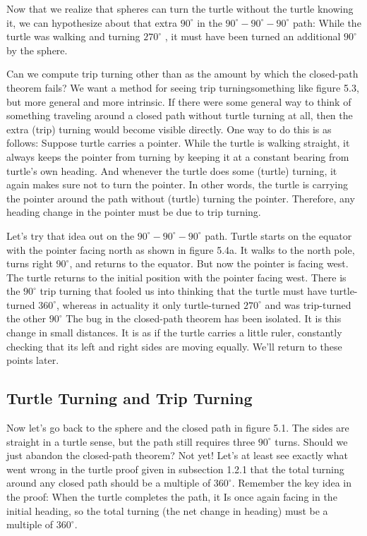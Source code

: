 \documentclass{book}
\begin{document}
Now that we realize that spheres can turn the turtle without the turtle
knowing it, we can hypothesize about that extra $90^{\circ}$ in the $90^{\circ}-90^{\circ}-90^{\circ}$
path: While the turtle was walking and turning $270^{\circ}$ , it must have been
turned an additional $90^{\circ}$ by the sphere.

Can we compute trip turning other than as the amount by which the
closed-path theorem fails? We want a method for seeing trip turningsomething like figure 5.3, but more general and more intrinsic. If there
were some general way to think of something traveling around a closed
path without turtle turning at all, then the extra (trip) turning would
become visible directly. One way to do this is as follows: Suppose turtle
carries a pointer. While the turtle is walking straight, it always keeps the
pointer from turning by keeping it at a constant bearing from turtle's
own heading. And whenever the turtle does some (turtle) turning, it
again makes sure not to turn the pointer. In other words, the turtle
is carrying the pointer around the path without (turtle) turning the
pointer. Therefore, any heading change in the pointer must be due to
trip turning.

Let's try that idea out on the $90^{\circ}-90^{\circ}-90^{\circ}$ path. Turtle starts on the
equator with the pointer facing north as shown in figure 5.4a. It walks
to the north pole, turns right $90^{\circ}$, and returns to the equator. But now
the pointer is facing west. The turtle returns to the initial position with
the pointer facing west. There is the $90^{\circ}$ trip turning that fooled us
into thinking that the turtle must have turtle-turned $360^{\circ}$, whereas in
actuality it only turtle-turned $270^{\circ}$ and was trip-turned the other $90^{\circ}$
The bug in the closed-path theorem has been isolated. It is this change in
small distances. It is as if the turtle carries a little ruler, constantly
checking that its left and right sides are moving equally. We'll return
to these points later.

\subsection{Turtle Turning and Trip Turning}

Now let's go back to the sphere and the closed path in figure 5.1. The
sides are straight in a turtle sense, but the path still requires three
$90^{\circ}$ turns. Should we just abandon the closed-path theorem? Not yet!
Let's at least see exactly what went wrong in the turtle proof given in
subsection 1.2.1 that the total turning around any closed path should
be a multiple of $360^{\circ}$. Remember the key idea in the proof: When the
turtle completes the path, it Is once again facing in the initial heading,
so the total turning (the net change in heading) must be a multiple of
$360^{\circ}$.
\end{document}
